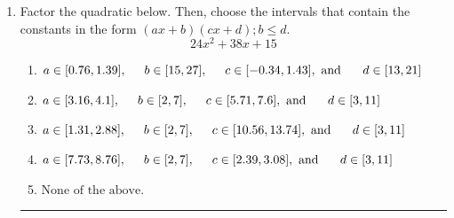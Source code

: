 \documentclass[14pt]{extbook}
\newcommand{\litem}[1]{\item#1\hspace*{-1cm}\rule{\textwidth}{0.4pt}}
\begin{document}
\begin{enumerate}
{\begin{enumerate}[label=\Alph*.]
\end{enumerate} }
\litem{
Factor the quadratic below. Then, choose the intervals that contain the constants in the form $(ax+b)(cx+d); b \leq d.$\[ 24x^{2} +38 x + 15 \]\begin{enumerate}[label=\Alph*.]
\item \( a \in [0.76, 1.39], \hspace*{5mm} b \in [15, 27], \hspace*{5mm} c \in [-0.34, 1.43], \text{ and } \hspace*{5mm} d \in [13, 21] \)
\item \( a \in [3.16, 4.1], \hspace*{5mm} b \in [2, 7], \hspace*{5mm} c \in [5.71, 7.6], \text{ and } \hspace*{5mm} d \in [3, 11] \)
\item \( a \in [1.31, 2.88], \hspace*{5mm} b \in [2, 7], \hspace*{5mm} c \in [10.56, 13.74], \text{ and } \hspace*{5mm} d \in [3, 11] \)
\item \( a \in [7.73, 8.76], \hspace*{5mm} b \in [2, 7], \hspace*{5mm} c \in [2.39, 3.08], \text{ and } \hspace*{5mm} d \in [3, 11] \)
\item \( \text{None of the above.} \)


\end{enumerate}}
\end{enumerate}
\end{document}
